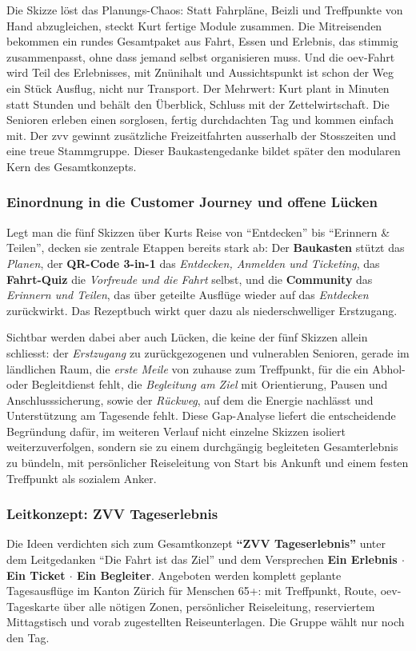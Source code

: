 Die Skizze löst das Planungs-Chaos: Statt Fahrpläne, Beizli und Treffpunkte von Hand abzugleichen, steckt Kurt fertige Module zusammen. Die Mitreisenden bekommen ein rundes Gesamtpaket aus Fahrt, Essen und Erlebnis, das stimmig zusammenpasst, ohne dass jemand selbst organisieren muss. Und die \gls{oev}-Fahrt wird Teil des Erlebnisses, mit Znünihalt und Aussichtspunkt ist schon der Weg ein Stück Ausflug, nicht nur Transport. Der Mehrwert: Kurt plant in Minuten statt Stunden und behält den Überblick, Schluss mit der Zettelwirtschaft. Die Senioren erleben einen sorglosen, fertig durchdachten Tag und kommen einfach mit. Der \gls{zvv} gewinnt zusätzliche Freizeitfahrten ausserhalb der Stosszeiten und eine treue Stammgruppe. Dieser Baukastengedanke bildet später den modularen Kern des Gesamtkonzepts.

\subsubsection{Einordnung in die Customer Journey und offene Lücken}
Legt man die fünf Skizzen über Kurts Reise von \enquote{Entdecken} bis \enquote{Erinnern \& Teilen}, decken sie zentrale Etappen bereits stark ab: Der \textbf{Baukasten} stützt das \emph{Planen}, der \textbf{QR-Code 3-in-1} das \emph{Entdecken, Anmelden und Ticketing}, das \textbf{Fahrt-Quiz} die \emph{Vorfreude und die Fahrt} selbst, und die \textbf{Community} das \emph{Erinnern und Teilen}, das über geteilte Ausflüge wieder auf das \emph{Entdecken} zurückwirkt. Das Rezeptbuch wirkt quer dazu als niederschwelliger Erstzugang.

Sichtbar werden dabei aber auch Lücken, die keine der fünf Skizzen allein schliesst: der \emph{Erstzugang} zu zurückgezogenen und vulnerablen Senioren, gerade im ländlichen Raum, die \emph{erste Meile} von zuhause zum Treffpunkt, für die ein Abhol- oder Begleitdienst fehlt, die \emph{Begleitung am Ziel} mit Orientierung, Pausen und Anschlusssicherung, sowie der \emph{Rückweg}, auf dem die Energie nachlässt und Unterstützung am Tagesende fehlt. Diese Gap-Analyse liefert die entscheidende Begründung dafür, im weiteren Verlauf nicht einzelne Skizzen isoliert weiterzuverfolgen, sondern sie zu einem durchgängig begleiteten Gesamterlebnis zu bündeln, mit persönlicher Reiseleitung von Start bis Ankunft und einem festen Treffpunkt als sozialem Anker.

\subsubsection{Leitkonzept: ZVV Tageserlebnis}
Die Ideen verdichten sich zum Gesamtkonzept \textbf{\enquote{ZVV Tageserlebnis}} unter dem Leitgedanken \enquote{Die Fahrt ist das Ziel} und dem Versprechen \textbf{Ein Erlebnis $\cdot$ Ein Ticket $\cdot$ Ein Begleiter}. Angeboten werden komplett geplante Tagesausflüge im Kanton Zürich für Menschen 65+: mit Treffpunkt, Route, \gls{oev}-Tageskarte über alle nötigen Zonen, persönlicher Reiseleitung, reserviertem Mittagstisch und vorab zugestellten Reiseunterlagen. Die Gruppe wählt nur noch den Tag.

